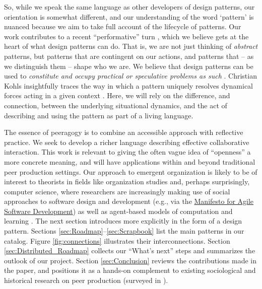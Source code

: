 So, while we speak the same language as other developers of design patterns, our orientation is somewhat different, and our understanding of the word `pattern' is nuanced because we aim to take full account of the lifecycle of patterns.  Our work contributes to a recent ``performative'' turn \cite{schummer2014beyond}, which we believe gets at the heart of what design patterns can do.   That is, we are not just thinking of \emph{abstract} patterns, but patterns that are contingent on our actions, and patterns that -- as we distinguish them -- shape who we are.  We believe that design patterns can be used to \emph{constitute and occupy practical or speculative problems as such} \cite[p. 204]{deleuze1994difference}.  Christian Kohls insightfully traces the way in which a pattern uniquely resolves dynamical forces acting in a given context \cite{kohls2010structure,kohls2011structure}.  Here, we will rely on the difference, and connection, between the underlying situational dynamics, and the act of describing and using the pattern as part of a living language.
%  

The essence of peeragogy is to combine an accessible approach with reflective practice.   We seek to develop a richer language describing effective collaborative interaction.  This work is relevant to giving the often vague idea of ``openness'' a more concrete meaning, and will have applications within and beyond traditional peer production settings.  Our approach to emergent organization is likely to be of interest to theorists in fields like organization studies and, perhaps surprisingly, computer science, where researchers are increasingly making use of social approaches to software design and development (e.g., via the \href{http://www.agilemanifesto.org/}{Manifesto for Agile Software Development}) as well as agent-based models of computation and learning \cite{minsky1967programming,poetry-workshop}.  The next section introduces  more explicitly in the form of a design pattern.  Sections \ref{sec:Roadmap}--\ref{sec:Scrapbook} list the main patterns in our catalog.    Figure \ref{fig:connections} illustrates their interconnections.  Section \ref{sec:Distributed_Roadmap} collects our ``What's next'' steps and summarizes the outlook of our project. Section \ref{sec:Conclusion} reviews the contributions made in the paper, and positions it as a hands-on complement to existing sociological and historical research on peer production (surveyed in \cite{benkler2015peer}).


